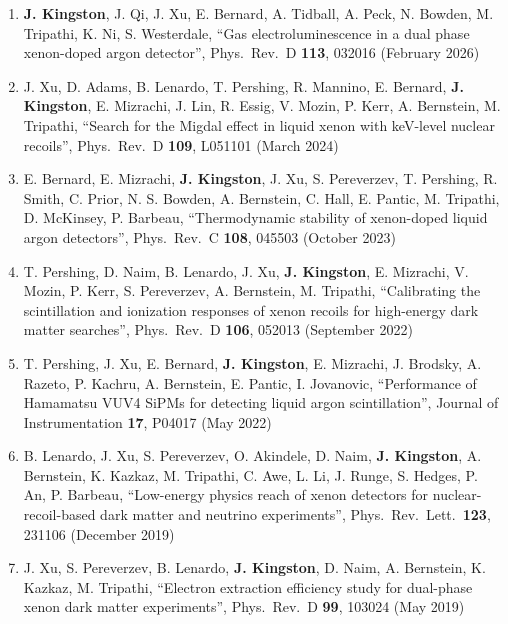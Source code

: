 \documentclass[11pt,letterpaper]{article}
\newenvironment{publist}
  {\begin{enumerate}[leftmargin=2.2em, topsep=2pt, itemsep=6pt, parsep=0pt]}
  {\end{enumerate}}
\begin{document}
\begin{publist}
  \item \textbf{J. Kingston}, J. Qi, J. Xu, E. Bernard, A. Tidball, A. Peck, N. Bowden,
        M. Tripathi, K. Ni, S. Westerdale, ``Gas electroluminescence in a dual phase
        xenon-doped argon detector'', Phys.\ Rev.\ D \textbf{113}, 032016
        (February 2026)

  \item J. Xu, D. Adams, B. Lenardo, T. Pershing, R. Mannino, E. Bernard,
        \textbf{J. Kingston}, E. Mizrachi, J. Lin, R. Essig, V. Mozin, P. Kerr,
        A. Bernstein, M. Tripathi, ``Search for the Migdal effect in liquid xenon with
        keV-level nuclear recoils'', Phys.\ Rev.\ D \textbf{109}, L051101 (March 2024)

  \item E. Bernard, E. Mizrachi, \textbf{J. Kingston}, J. Xu, S. Pereverzev,
        T. Pershing, R. Smith, C. Prior, N. S. Bowden, A. Bernstein, C. Hall, E. Pantic,
        M. Tripathi, D. McKinsey, P. Barbeau, ``Thermodynamic stability of xenon-doped
        liquid argon detectors'', Phys.\ Rev.\ C \textbf{108}, 045503 (October 2023)

  \item T. Pershing, D. Naim, B. Lenardo, J. Xu, \textbf{J. Kingston}, E. Mizrachi,
        V. Mozin, P. Kerr, S. Pereverzev, A. Bernstein, M. Tripathi, ``Calibrating the
        scintillation and ionization responses of xenon recoils for high-energy dark
        matter searches'', Phys.\ Rev.\ D \textbf{106}, 052013 (September 2022)

  \item T. Pershing, J. Xu, E. Bernard, \textbf{J. Kingston}, E. Mizrachi, J. Brodsky,
        A. Razeto, P. Kachru, A. Bernstein, E. Pantic, I. Jovanovic, ``Performance of
        Hamamatsu VUV4 SiPMs for detecting liquid argon scintillation'', Journal of
        Instrumentation \textbf{17}, P04017 (May 2022)

  \item B. Lenardo, J. Xu, S. Pereverzev, O. Akindele, D. Naim, \textbf{J. Kingston},
        A. Bernstein, K. Kazkaz, M. Tripathi, C. Awe, L. Li, J. Runge, S. Hedges, P. An,
        P. Barbeau, ``Low-energy physics reach of xenon detectors for
        nuclear-recoil-based dark matter and neutrino experiments'',
        Phys.\ Rev.\ Lett.\ \textbf{123}, 231106 (December 2019)

  \item J. Xu, S. Pereverzev, B. Lenardo, \textbf{J. Kingston}, D. Naim, A. Bernstein,
        K. Kazkaz, M. Tripathi, ``Electron extraction efficiency study for dual-phase
        xenon dark matter experiments'', Phys.\ Rev.\ D \textbf{99}, 103024 (May 2019)
\end{publist}
\end{document}
